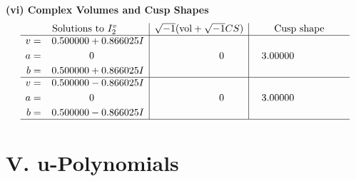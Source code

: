 \documentclass[1p]{elsarticle_modified}
\theoremstyle{definition}
\newcommand{\I}{\sqrt{-1}}
\begin{document}
\newpage\flushleft \textbf{(vi) Complex Volumes and Cusp Shapes}
$$\begin{array}{c|c|c}  
\text{Solutions to }I^v_{2}& \I (\text{vol} + \sqrt{-1}CS) & \text{Cusp shape}\\
 \hline 
\begin{aligned}
v &= \phantom{-}0.500000 + 0.866025 I \\
a &= \phantom{-0.000000 } 0 \\
b &= \phantom{-}0.500000 + 0.866025 I\end{aligned}
 & \phantom{-0.000000 } 0 & \phantom{-}3.00000\phantom{ +0.000000I} \\ \hline\begin{aligned}
v &= \phantom{-}0.500000 - 0.866025 I \\
a &= \phantom{-0.000000 } 0 \\
b &= \phantom{-}0.500000 - 0.866025 I\end{aligned}
 & \phantom{-0.000000 } 0 & \phantom{-}3.00000\phantom{ +0.000000I}\\
 \hline 
 \end{array}$$\newpage
\newpage\renewcommand{\arraystretch}{1}
\centering \section*{ V. u-Polynomials}
\end{document}
